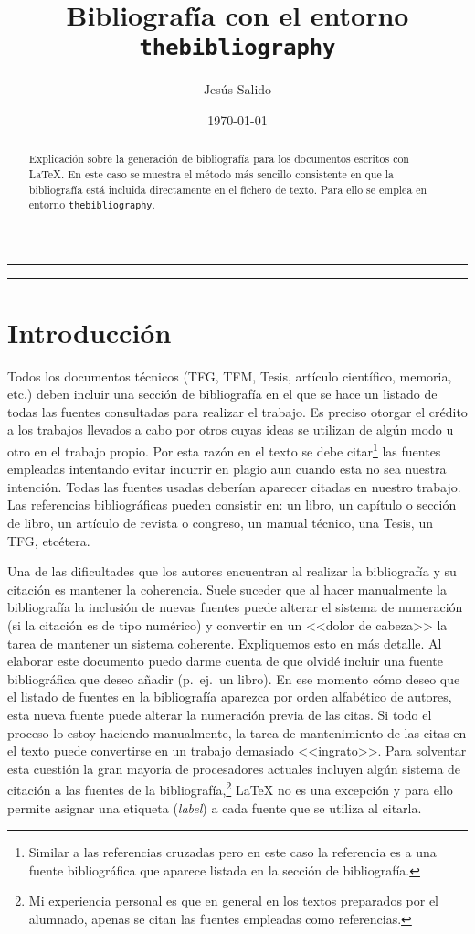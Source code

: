 \documentclass[11pt,a4paper]{article}
\author{Jesús Salido}
\title{Bibliografía con el entorno \texttt{thebibliography}}
\date{\today}
\begin{document}
\maketitle


\begin{abstract}
	Explicación sobre la generación de bibliografía para los documentos escritos con \LaTeX{}. En este caso se muestra el método más sencillo consistente en que la bibliografía está incluida directamente en el fichero de texto. Para ello se emplea en entorno \texttt{thebibliography}.
\end{abstract}

\hrule
\tableofcontents
\bigskip
\hrule

\section{Introducción}
Todos los documentos técnicos (TFG, TFM, Tesis, artículo científico, memoria, etc.) deben incluir una sección de bibliografía en el que se hace un listado de todas las fuentes consultadas para realizar el trabajo. Es preciso otorgar el crédito a los trabajos llevados a cabo por otros cuyas ideas se utilizan de algún modo u otro en el trabajo propio. Por esta razón en el texto se debe citar\footnote{Similar a las referencias cruzadas pero en este caso la referencia es a una fuente bibliográfica que aparece listada en la sección de bibliografía.} las fuentes empleadas intentando evitar incurrir en plagio \cite{usbplagio2010} aun cuando esta no sea nuestra intención. Todas las fuentes usadas deberían aparecer citadas en nuestro trabajo. Las referencias bibliográficas pueden consistir en: un libro, un capítulo o sección de libro, un artículo de revista o congreso, un manual técnico, una Tesis, un TFG, etcétera.

Una de las dificultades que los autores encuentran al realizar la bibliografía y su citación es mantener la coherencia. Suele suceder que al hacer manualmente la bibliografía la inclusión de nuevas fuentes puede alterar el sistema de numeración (si la citación es de tipo numérico) y convertir en un <<dolor de cabeza>> la tarea de mantener un sistema coherente. Expliquemos esto en más detalle. Al elaborar este documento puedo darme cuenta de que olvidé incluir una fuente bibliográfica que deseo añadir (p.~ej.\ un libro). En ese momento cómo deseo que el listado de fuentes en la bibliografía aparezca por orden alfabético de autores, esta nueva fuente puede alterar la numeración previa de las citas. Si todo el proceso lo estoy haciendo manualmente, la tarea de mantenimiento de las citas en el texto puede convertirse en un trabajo demasiado <<ingrato>>. Para solventar esta cuestión la gran mayoría de procesadores actuales incluyen algún sistema de citación a las fuentes de la bibliografía,\footnote{Mi experiencia personal es que en general en los textos preparados por el alumnado, apenas se citan las fuentes empleadas como referencias.} \LaTeX{} no es una excepción y para ello permite asignar una etiqueta (\emph{label}) a cada fuente que se utiliza al citarla. 
\end{document}
